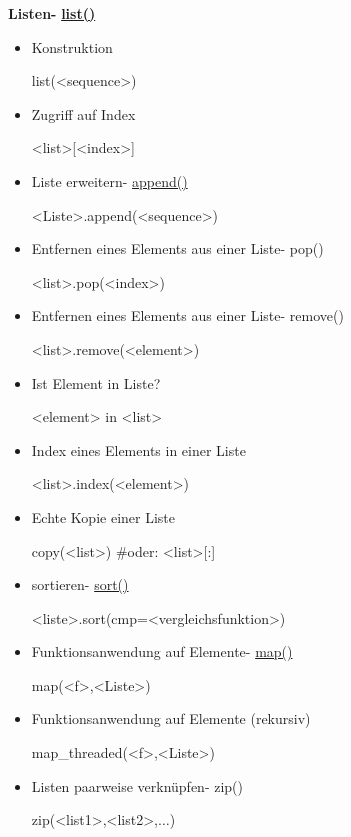 \documentclass[a4paper,9pt,DIV15,twocolumn]{scrartcl}
\begin{document}
\textbf{Listen- } \href{http://docs.python.org/library/functions.html#list}{\textbf{list()}}
\begin{itemize}
 \item Konstruktion
\begin{sagein}
[a,b,c,...] 
list(<sequence>)
\end{sagein}
\item Zugriff auf Index
	\begin{sagein}
<list>[<index>]
	\end{sagein}

\item Liste erweitern- \href{https://sage.math.uni-goettingen.de/doc/static/reference/sage/misc/explain_pickle.html?highlight=append#sage.misc.explain_pickle.TestAppendList}{append()}
\begin{sagein}
<Liste>.append(<sequence>)
\end{sagein}
\item Entfernen eines Elements aus einer Liste- pop()
	\begin{sagein}
<list>.pop(<index>)
	\end{sagein}
\item Entfernen eines Elements aus einer Liste- remove()
	\begin{sagein}
<list>.remove(<element>)
	\end{sagein}	
\item Ist Element in Liste?
	\begin{sagein}
<element> in <list>
	\end{sagein}
\item Index eines Elements in einer Liste
	\begin{sagein}
<list>.index(<element>)
	\end{sagein}
\item Echte Kopie einer Liste
	\begin{sagein}
copy(<list>) #oder: <list>[:]
	\end{sagein}
\item sortieren- \href{https://sage.math.uni-goettingen.de/doc/static/reference/sage/structure/sequence.html?highlight=sort#sage.structure.sequence.Sequence_generic.sort}{sort()}
\begin{sagein}
 <liste>.sort(cmp=<vergleichsfunktion>)
\end{sagein}
\item Funktionsanwendung auf Elemente- \href{https://sage.math.uni-goettingen.de/doc/static/reference/sage/combinat/generator.html?highlight=map#sage.combinat.generator.map}{map()}
\begin{sagein}
 map(<f>,<Liste>)
\end{sagein}
\item Funktionsanwendung auf Elemente (rekursiv)
\begin{sagein}
 map_threaded(<f>,<Liste>)
\end{sagein}
\item Listen paarweise verkn\"upfen- zip()
	\begin{sagein}
zip(<list1>,<list2>,$\ldots$)
	\end{sagein}
\end{itemize}
\end{document}
